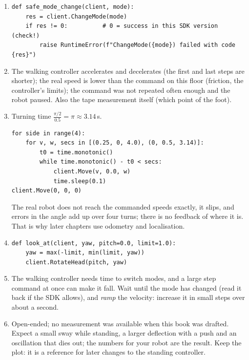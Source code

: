 \begin{enumerate}[label=\textbf{\ansnum.\arabic*}]
  \item
\begin{verbatim}
def safe_mode_change(client, mode):
    res = client.ChangeMode(mode)
    if res != 0:          # 0 = success in this SDK version (check!)
        raise RuntimeError(f"ChangeMode({mode}) failed with code {res}")
\end{verbatim}
  \item The walking controller accelerates and decelerates (the first and last steps are shorter); the real speed is lower than the command on this floor (friction, the controller's limits); the command was not repeated often enough and the robot paused. Also the tape measurement itself (which point of the foot).
  \item Turning time $\frac{\pi/2}{0.5}=\pi\approx3.14$\,s.
\begin{verbatim}
for side in range(4):
    for v, w, secs in [(0.25, 0, 4.0), (0, 0.5, 3.14)]:
        t0 = time.monotonic()
        while time.monotonic() - t0 < secs:
            client.Move(v, 0.0, w)
            time.sleep(0.1)
client.Move(0, 0, 0)
\end{verbatim}
The real robot does not reach the commanded speeds exactly, it slips, and errors in the angle add up over four turns; there is no feedback of where it is. That is why later chapters use odometry and localisation.
  \item
\begin{verbatim}
def look_at(client, yaw, pitch=0.0, limit=1.0):
    yaw = max(-limit, min(limit, yaw))
    client.RotateHead(pitch, yaw)
\end{verbatim}
  \item The walking controller needs time to switch modes, and a large step command at once can make it fall. Wait until the mode has changed (read it back if the SDK allows), and \emph{ramp} the velocity: increase it in small steps over about a second.
  \item Open-ended; no measurement was available when this book was drafted. Expect a small sway while standing, a larger deflection with a push and an oscillation that dies out; the numbers for your robot are the result. Keep the plot: it is a reference for later changes to the standing controller.
\end{enumerate}
